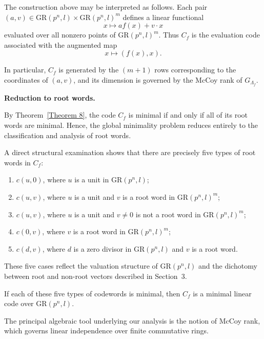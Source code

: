\documentclass[10pt]{article}
\theoremstyle{definition}
\begin{document}
\medskip

The construction above may be interpreted as follows.
Each pair $(a,v)\in \mathrm{GR}(p^n,l)\times \mathrm{GR}(p^n,l)^m$
defines a linear functional
\[
x \longmapsto a f(x)+v\cdot x
\]
evaluated over all nonzero points of $\mathrm{GR}(p^n,l)^m$.
Thus $C_f$ is the evaluation code associated with the augmented map
\[
x \longmapsto (f(x),x).
\]

In particular, $C_f$ is generated by the $(m+1)$ rows corresponding to the coordinates
of $(a,v)$, and its dimension is governed by the McCoy rank of $G_{\Lambda_f}$.

\medskip
\noindent
\textbf{Reduction to root words.}

By Theorem~\ref{Theorem 8},
the code $C_f$ is minimal if and only if all of its root words are minimal.
Hence, the global minimality problem reduces entirely to the classification
and analysis of root words.

A direct structural examination shows that there are precisely five types
of root words in $C_f$:

\begin{enumerate}
\item $c(u,0)$, where $u$ is a unit in $\mathrm{GR}(p^n,l)$;

\item $c(u,v)$, where $u$ is a unit and $v$ is a root word
      in $\mathrm{GR}(p^n,l)^m$;

\item $c(u,v)$, where $u$ is a unit and
      $v\neq 0$ is not a root word in $\mathrm{GR}(p^n,l)^m$;

\item $c(0,v)$, where $v$ is a root word in $\mathrm{GR}(p^n,l)^m$;

\item $c(d,v)$, where $d$ is a zero divisor in $\mathrm{GR}(p^n,l)$
      and $v$ is a root word.
\end{enumerate}

These five cases reflect the valuation structure of $\mathrm{GR}(p^n,l)$
and the dichotomy between root and non-root vectors described in Section~3.

If each of these five types of codewords is minimal,
then $C_f$ is a minimal linear code over $\mathrm{GR}(p^n,l)$.

\medskip

The principal algebraic tool underlying our analysis
is the notion of McCoy rank,
which governs linear independence over finite commutative rings.
\end{document}

